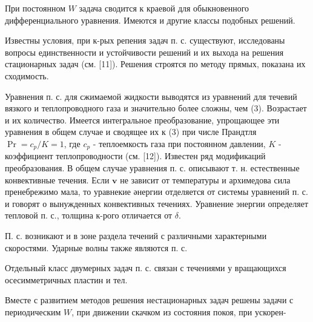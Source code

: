 \documentclass[10pt]{article}
\begin{document}
При постоянном $W$ задача сводится к краевой для обыкновенного дифференциального уравнения. Имеются и другие классы подобных решений.



Известны условия, при к-рых репения задач п. с. существуют, исследованы вопросы единственности и устойчивости решений и их выхода на решения стационарных задач (см. [11]). Решения строятся по методу прямых, показана их сходимость.



Уравнения п. с. для сжимаемой жидкости выводятся из уравнений для течевий вязкого и теплопроводного газа и значительно более сложны, чем (3). Возрастает и их количество. Имеется интегральное преобразование, упрощающее эти уравнения в общем случае и сводящее их к (3) при числе Прандтля $\operatorname{Pr}=c_{p} / K=1$, где $c_{p}$ - теплоемкость газа при постоянном давлении, $K$ - коэффициент теплопроводности (см. [12]). Известен ряд модификаций преобразования. В общем случае уравнения п. с. описывают т. н. естественные конвективные течения. Если $\boldsymbol{v}$ не зависит от температуры и архимедова сила пренебрежимо мала, то уравнекие әнергии отделяется от системы уравнений п. с. и говорят о вынужденных конвективных течениях. Уравнение энергии определяет тепловой п. с., толщина к-рого отличается от $\delta$.



П. с. возникают и в зоне раздела течений с различными характерными скоростями. Ударные волны также являются п. с.



Отдельный класс двумерных задач п. с. связан с течениями у вращающихся осесимметричных пластин и тел.



Вместе с развитием методов решения нестационарных задач решены задачи с периодическим $W$, при движении скачком из состояния покоя, при ускорен-
\end{document}
